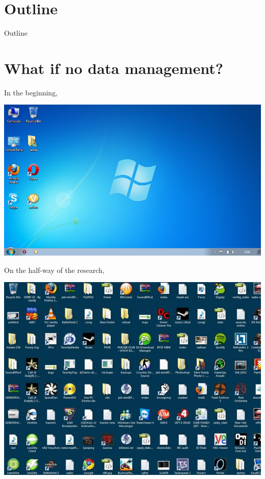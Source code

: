 \section*{Outline}
\begin{frame}{Outline}
          \tableofcontents
\end{frame}

\section{What if no data management?}

\begin{frame}{\secname}
In the beginning, 
\begin{center}
		\includegraphics[scale=0.4]{image/desktop}
\end{center}
\end{frame}

\begin{frame}{\secname}
On the half-way of the research, \\
\begin{center}
		\includegraphics[scale=0.5]{image/messy-desktop}
\end{center}
\end{frame}

